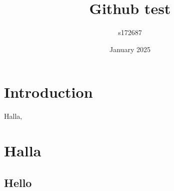\documentclass{article}
\title{Github test}
\author{s172687 }
\date{January 2025}
\begin{document}
\maketitle

\section{Introduction}
Halla, 
\section{Halla}

\subsection{Hello}
\end{document}
